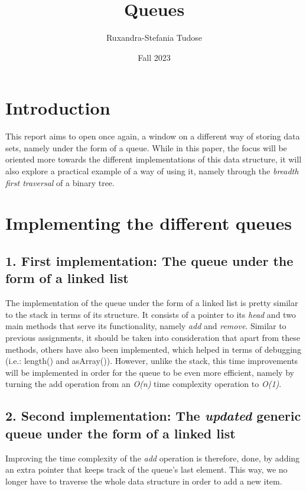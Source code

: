 \documentclass[a4paper,11pt]{article}
\begin{document}
\title{
    \textbf{Queues}
}
\author{Ruxandra-Stefania Tudose}
\date{Fall 2023}

\maketitle

\section*{Introduction}
This report aims to open once again, a window on a different way of storing data sets, namely under the form of a queue. While in this paper, the focus will be oriented more towards the different implementations of this data structure, it will also explore a practical example of a way of using it, namely through the \textit{breadth first traversal} of a binary tree.

\section*{Implementing the different queues}

\subsection*{1. First implementation: The queue under the form of a linked list}
The implementation of the queue under the form of a linked list is pretty similar to the stack in terms of its structure. It consists of a pointer to its \textit{head} and two main methods that serve its functionality, namely \textit{add} and \textit{remove}. Similar to previous assignments, it should be taken into consideration that apart from these methods, others have also been implemented, which helped in terms of debugging (i.e.: length() and asArray()). However, unlike the stack, this time improvements will be implemented in order for the queue to be even more efficient, namely by turning the add operation from an \textit{O(n)} time complexity operation to \textit{O(1)}. 

\subsection*{2. Second implementation: The \textit{updated} generic queue under the form of a linked list}
Improving the time complexity of the \textit{add} operation is therefore, done, by adding an extra pointer that keeps track of the queue's last element. This way, we no longer have to traverse the whole data structure in order to add a new item.\newline
\end{document}
